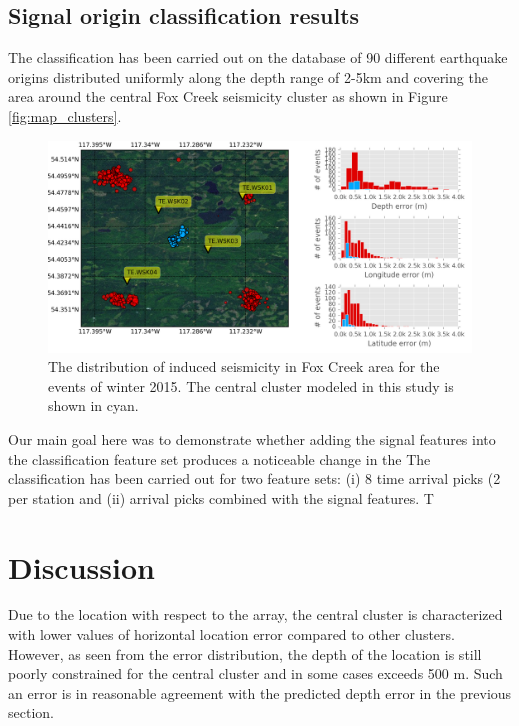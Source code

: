 \subsection{Signal origin classification results}
The classification has been carried out on the database of 90 different earthquake origins distributed uniformly along the depth range of 2-5km and covering the area around the central Fox Creek seismicity cluster as shown in Figure \ref{fig:map_clusters}.
\begin{figure}[htb]
\begin{center}
\includegraphics[width=0.85\linewidth,angle=0]{./AntonBiryukov_bibtex/figure_map_a.png}
\end{center}
\vspace{-4mm}
\caption{The distribution of induced seismicity in Fox Creek area for the events of winter 2015. The central cluster modeled in this study is shown in cyan.}
\label{fig:ind_error}
\end{figure}

Our main goal here was to demonstrate whether adding the signal features into the classification feature set produces a noticeable change in the 
The classification has been carried out for two feature sets: (i) 8 time arrival picks (2 per station and (ii) arrival picks combined with the signal features. T





\section{Discussion}
Due to the location with respect to the array, the central cluster is characterized with lower values of horizontal location error compared to other clusters. However, as seen from the error distribution, the depth of the location is still poorly constrained for the central cluster and in some cases exceeds 500 m. Such an error is in reasonable agreement with the predicted depth error in the previous section.
